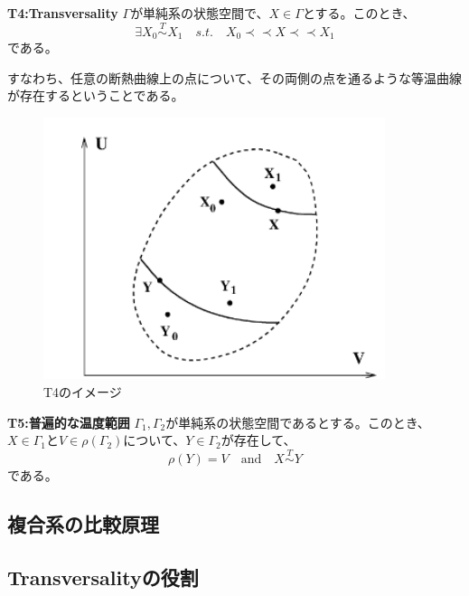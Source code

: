 \documentclass[a4paper,11pt]{jsarticle}
\begin{document}
\begin{itembox}[l]{\textbf{T4:Transversality}}
    $\Gamma$が単純系の状態空間で、$X \in \Gamma$とする。このとき、
    \begin{equation}
    \exists X_0 \overset{T}{\sim} X_1 \quad s.t.\quad  X_0 \prec \prec X \prec \prec X_1
    \end{equation}
    である。
\end{itembox}
すなわち、任意の断熱曲線上の点について、その両側の点を通るような等温曲線が存在するということである。\\
\begin{figure}[H]
    \begin{center}
    \includegraphics[width=100mm]{fig6a.png}
    \end{center}
    \caption{T4のイメージ}
    \label{fig:four}
\end{figure}

\begin{itembox}[l]{\textbf{T5:普遍的な温度範囲}}
    $\Gamma_1,\Gamma_2$が単純系の状態空間であるとする。このとき、$X \in \Gamma_1$と$V \in \rho (\Gamma_2)$について、$Y \in \Gamma_2$が存在して、
    \begin{equation}
        \rho(Y) =V \quad \text{and} \quad X \overset{T}{\sim} Y
    \end{equation}
    である。
\end{itembox}

\subsection{複合系の比較原理}

\subsection{Transversalityの役割}
\end{document}
